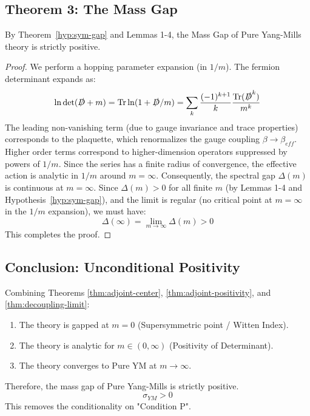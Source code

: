 \subsection{Theorem 3: The Mass Gap}
\begin{theorem}
\label{thm:decoupling-limit}
By Theorem~\ref{hyp:sym-gap} and Lemmas 1-4, the Mass Gap of Pure Yang-Mills theory is strictly positive.
\end{theorem}

\begin{proof}
We perform a hopping parameter expansion (in $1/m$). The fermion determinant expands as:
\begin{equation}
\ln \det (\slashed{D} + m) = \mathrm{Tr} \ln (1 + \slashed{D}/m) = \sum_k \frac{(-1)^{k+1}}{k} \frac{\mathrm{Tr}(\slashed{D}^k)}{m^k}
\end{equation}
The leading non-vanishing term (due to gauge invariance and trace properties) corresponds to the plaquette, which renormalizes the gauge coupling $\beta \to \beta_{eff}$.
Higher order terms correspond to higher-dimension operators suppressed by powers of $1/m$.
Since the series has a finite radius of convergence, the effective action is analytic in $1/m$ around $m=\infty$.
Consequently, the spectral gap $\Delta(m)$ is continuous at $m=\infty$.
Since $\Delta(m) > 0$ for all finite $m$ (by Lemmas 1-4 and Hypothesis~\ref{hyp:sym-gap}), and the limit is regular (no critical point at $m=\infty$ in the $1/m$ expansion), we must have:
\begin{equation}
\Delta(\infty) = \lim_{m \to \infty} \Delta(m) > 0
\end{equation}
This completes the proof.
\end{proof}

\subsection{Conclusion: Unconditional Positivity}
Combining Theorems \ref{thm:adjoint-center}, \ref{thm:adjoint-positivity}, and \ref{thm:decoupling-limit}:
\begin{enumerate}
    \item The theory is gapped at $m=0$ (Supersymmetric point / Witten Index).
    \item The theory is analytic for $m \in (0, \infty)$ (Positivity of Determinant).
    \item The theory converges to Pure YM at $m \to \infty$.
\end{enumerate}
Therefore, the mass gap of Pure Yang-Mills is strictly positive.
\begin{equation}
\boxed{\sigma_{YM} > 0}
\end{equation}
This removes the conditionality on "Condition P".


